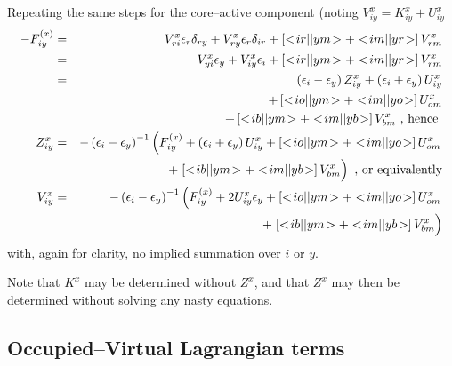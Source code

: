 \documentclass[fleqn,12pt]{article}
\newcommand{\bra}{<\!}
\newcommand{\ket}{\!>}
\newcommand{\Fx}{F^{(x)}}
\begin{document}
Repeating the same steps for the core--active component (noting
$V^x_{iy} = K^x_{iy} + U^x_{iy}$
\begin{eqnarray}
  -\Fx_{iy} & = & V^x_{ri} \epsilon_r \delta_{ry} + 
   V^x_{ry} \epsilon_r \delta_{ir} +
  \left[ \bra ir||ym \ket + \bra im||yr \ket \right] V^x_{rm} \\
  & = &  V^x_{yi} \epsilon_y +  V^x_{iy} \epsilon_i + 
  \left[ \bra ir||ym \ket + \bra im||yr \ket \right] V^x_{rm} \\
  & = &   \left( \epsilon_i -  \epsilon_y \right) Z^x_{iy} +  
          \left( \epsilon_i +  \epsilon_y \right) U^x_{iy}  \nonumber         \\ 
  & & + \left[ \bra io||ym \ket + \bra im||yo \ket \right] U^x_{om} \nonumber \\ 
  & & + \left[ \bra ib||ym \ket + \bra im||yb \ket \right] V^x_{bm}
  \mbox{ , hence }\\
  Z^x_{iy} & = & - \left( \epsilon_i -  \epsilon_y \right)^{-1} \left( \rule{0in}{0.15in}
    \Fx_{iy} + \left( \epsilon_i +  \epsilon_y \right) U^x_{iy}
  + \left[ \bra io||ym \ket + \bra im||yo \ket \right] U^x_{om}
   \right.  \nonumber\\ 
  & & + \left. \left[ \bra ib||ym \ket + \bra im||yb \ket \right]
    V^x_{bm}  \rule{0in}{0.15in} \right) \mbox{ , or equivalently} \\
  V^x_{iy} & = & - \left( \epsilon_i -  \epsilon_y \right)^{-1} \left( \rule{0in}{0.15in}
    \Fx_{iy} + 2 U^x_{iy}  \epsilon_y 
  + \left[ \bra io||ym \ket + \bra im||yo \ket \right] U^x_{om}
   \right.  \nonumber\\ 
  & & + \left. \left[ \bra ib||ym \ket + \bra im||yb \ket \right]
    V^x_{bm}  \rule{0in}{0.15in} \right) \label{eqn:viy}
\end{eqnarray}
with, again for clarity, no implied summation over $i$ or $y$.

Note that $K^x$ may be determined without $Z^x$, and that $Z^x$ may
then be determined without solving any nasty equations.

\subsection{Occupied--Virtual Lagrangian terms}
\label{sec:ovlag}
\end{document}
